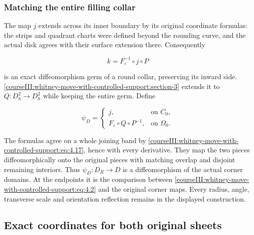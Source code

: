 \subsubsection{Matching the entire filling collar}
\label{courseIII:whitney-move-with-controlled-support:section-4.3}

The map \(j\) extends across its inner boundary by its original coordinate formulas: the strips and quadrant charts were defined beyond the rounding curve, and the actual disk agrees with their surface extension there. Consequently

\begin{equation}
k=F_\varepsilon^{-1}\circ j\circ P
\label{courseIII:whitney-move-with-controlled-support:eq:4.17}
\end{equation}

is an exact diffeomorphism germ of a round collar, preserving its inward side. \cref{courseIII:whitney-move-with-controlled-support:section-3} extends it to \(Q:D_h^2\to D_h^2\) while keeping the entire germ. Define

\begin{equation}
\psi_D=
\begin{cases}
j,&\text{on }C_0,\\
F_\varepsilon\circ Q\circ P^{-1},&\text{on }\Omega_0.
\end{cases}
\label{courseIII:whitney-move-with-controlled-support:eq:4.18}
\end{equation}

The formulas agree on a whole joining band by \eqref{courseIII:whitney-move-with-controlled-support:eq:4.17}, hence with every derivative. They map the two pieces diffeomorphically onto the original pieces with matching overlap and disjoint remaining interiors. Thus \(\psi_D:D_R\to D\) is a diffeomorphism of the actual corner domains. At the endpoints it is the comparison between \eqref{courseIII:whitney-move-with-controlled-support:eq:4.2} and the original corner maps. Every radius, angle, transverse scale and orientation reflection remains in the displayed construction.

\subsection{Exact coordinates for both original sheets}
\label{courseIII:whitney-move-with-controlled-support:move-sheet-coordinates}

\label{courseIII:whitney-move-with-controlled-support:section-5}\label{courseIII:whitney-support:5}


